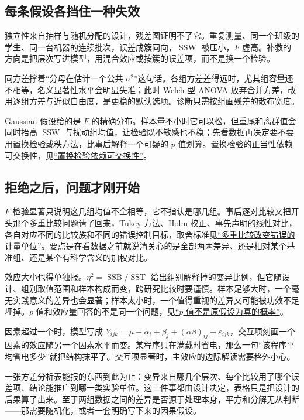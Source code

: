 \subsection{每条假设各挡住一种失效}

独立性来自抽样与随机分配的设计，残差图证明不了它。重复测量、同一个班级的学生、同一台机器的连续批次，误差成簇同向，\(\operatorname{SSW}\) 被压小，\(F\) 虚高。补救的方向是把层次写进模型，用混合效应或按簇的误差项，而不是换一个检验。

同方差撑着``分母在估计一个公共 \(\sigma^2\)''这句话。各组方差差得远时，尤其组容量还不相等，名义显著性水平会明显失准；此时 Welch 型 ANOVA 放弃合并方差，改用逐组方差与近似自由度，是更稳的默认选项。诊断只需按组画残差的散布宽度。

Gaussian 假设给的是 \(F\) 的精确分布。样本量不小时它可以松，但重尾和离群值会同时抬高 \(\operatorname{SSW}\) 与扰动组均值，让检验既不敏感也不稳；先看数据再决定要不要用置换检验或秩方法，比事后解释一个可疑的 \(p\) 值划算。置换检验的正当性依赖可交换性，见\hyperref[sec:11-Mathematical-Statistics/06-Resampling-and-Model-Selection/02]{``置换检验依赖可交换性''}。

\subsection{拒绝之后，问题才刚开始}

\(F\) 检验显著只说明这几组均值不全相等，它不指认是哪几组。事后逐对比较又把开头那个多重比较问题请了回来，Tukey 方法、Holm 校正、事先声明的线性对比，各自对应不同的比较族和不同的错误控制目标，取舍标准见\hyperref[sec:11-Mathematical-Statistics/05-Hypothesis-Testing/04]{``多重比较改变错误的计量单位''}。要点是在看数据之前就说清关心的是全部两两差异、还是相对某个基准组、还是某个有科学含义的加权对比。

效应大小也得单独报。\(\eta^2 = \operatorname{SSB}/\operatorname{SST}\) 给出组别解释掉的变异比例，但它随设计、组别取值范围和样本构成而变，跨研究比较时要谨慎。样本足够大时，一个毫无实践意义的差异也会显著；样本太小时，一个值得重视的差异又可能被功效不足埋掉。\(p\) 值和效应量回答的不是同一个问题，见\hyperref[sec:11-Mathematical-Statistics/05-Hypothesis-Testing/02]{``\(p\) 值不是原假设为真的概率''}。

因素超过一个时，模型写成 \(Y_{ijk} = \mu + \alpha_i + \beta_j + (\alpha\beta)_{ij} + \varepsilon_{ijk}\)，交互项刻画一个因素的效应随另一个因素水平而变。某程序只在满载时省电，那么一句``该程序平均省电多少''就把结构抹平了。交互项显著时，主效应的边际解读需要格外小心。

一张方差分析表能报的东西到此为止：变异来自哪几个层次、每个比较用了哪个误差项、结论能推广到哪一类实验单位。这三件事都由设计决定，表格只是把设计的后果算了出来。至于两组数据之间的差异是否源于处理本身，平方和分解无从判断——那需要随机化，或者一套明确写下来的因果假设。
